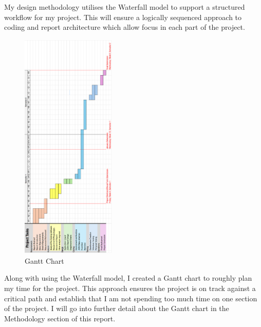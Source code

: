 \documentclass{report}
\begin{document}
My design methodology utilises the Waterfall model to support a structured workflow for my project. This will ensure a logically sequenced approach to coding and report architecture which allow focus in each part of the project.
\newpage
\begin{center}
    \begin{figure}[h]
        \centering
        \includegraphics[width=0.4\textwidth, angle=270]{gantt_chart}
        \caption{Gantt Chart}
        \label{fig:gantt_chart}
    \end{figure}
\end{center}
Along with using the Waterfall model, I created a Gantt chart to roughly plan my time for the project. This approach ensures the project is on track against a critical path and establish that I am not spending too much time on one section of the project. I will go into further detail about the Gantt chart in the Methodology section of this report.
\newpage
\end{document}
